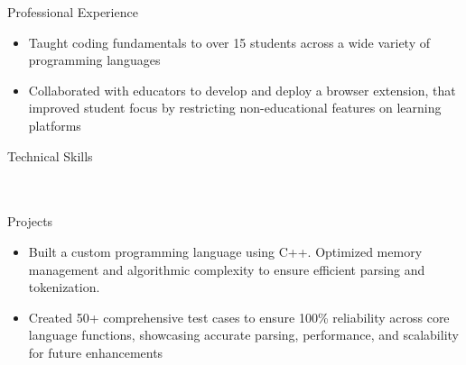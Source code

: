 \documentclass{resume}
\begin{document}
\begin{experienceSection}{Professional Experience}
    \experienceItem[
        company={theCoderSchool},
        location={Berkeley Heights, NJ},
        position={Code Tutor},
        duration={March 2024 - August 2024}
    ]
    \begin{itemize}[itemsep=-6pt, leftmargin=1.2em, rightmargin=0.8em, before=\raggedright, after=\normalfont]
        \item Taught coding fundamentals to over 15 students across a wide variety of programming languages
        \item Collaborated with educators to develop and deploy a browser extension, that improved student focus by restricting non-educational features on learning platforms
    \end{itemize}

\end{experienceSection}

\begin{skillsSection}{Technical Skills}
    \skillItem[
        category={Languages},
        skills={Python, C, C++, JavaScript, TypeScript, Java, PHP, SQL}
    ] \\
    \skillItem[
        category={Frontend},
        skills={React, Next.js, Vue, Tailwind CSS}
    ] \\
    \skillItem[
        category={Backend},
        skills={Node.js, MongoDB, Zustand}
    ] \\
    \skillItem[
        category={Tools \& Environments},
        skills={AWS, EKS, ECR, Terraform, ArgoCD, CircleCI, Linux/Unix, Git, Bash}
    ]
\end{skillsSection}

\begin{experienceSection}{Projects}
    \projectItem[
        title={Mini C-Like Programming Language},
    ]
    \vspace{-0.5em}
    \begin{itemize}[topsep=0pt, itemsep=-6pt, leftmargin=1.2em, rightmargin=0.8em, before=\raggedright, after=\normalfont]
        \item Built a custom programming language using C++. Optimized memory management and algorithmic complexity to ensure efficient parsing and tokenization.
        \item Created 50+ comprehensive test cases to ensure 100\% reliability across core language functions, showcasing accurate parsing, performance, and scalability for future enhancements
    \end{itemize}
\end{experienceSection}
\end{document}
